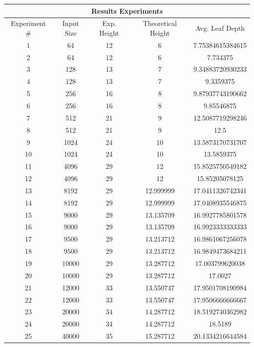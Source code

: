 \documentclass[12pt, a4paper]{article}
\begin{document}
\begin{table}[H]
    \begin{tabular}{ |c|c|c|c|c| }
      \hline
      \multicolumn{5}{|c|}{Results Experiments} \\
      \hline
      Experiment \# & Input Size & Exp. Height & Theoretical Height & Avg. Leaf Depth  \\
      \hline
      1 & 64 & 12 & 6 & 7.75384615384615 \\
      2 & 64 & 12 & 6 & 7.734375 \\
      3 & 128 & 13 & 7 & 9.34883720930233 \\
      4 & 128 & 13 & 7 & 9.3359375 \\
      5 & 256 & 16 & 8 & 9.87937743190662 \\
      6 & 256 & 16 & 8 & 9.85546875 \\
      7 & 512 & 21 & 9 & 12.5087719298246 \\
      8 & 512 & 21 & 9 & 12.5 \\
      9 & 1024 & 24 & 10 & 13.5873170731707 \\
      10 & 1024 & 24 & 10 & 13.5859375 \\
      11 & 4096 & 29 & 12 & 15.8525750549182 \\
      12 & 4096 & 29 & 12 & 15.85205078125 \\
      13 & 8192 & 29 & 12.999999 & 17.0411326742341 \\
      14 & 8192 & 29 & 12.999999 & 17.0408935546875 \\
      15 & 9000 & 29 & 13.135709 & 16.9927785801578 \\
      16 & 9000 & 29 & 13.135709 & 16.9923333333333 \\
      17 & 9500 & 29 & 13.213712 & 16.9861067256078 \\
      18 & 9500 & 29 & 13.213712 & 16.9849473684211 \\
      19 & 10000 & 29 & 13.287712 & 17.003799620038 \\
      20 & 10000 & 29 & 13.287712 & 17.0027 \\
      21 & 12000 & 33 & 13.550747 & 17.9501708190984 \\
      22 & 12000 & 33 & 13.550747 & 17.9506666666667 \\
      23 & 20000 & 34 & 14.287712 & 18.5192740362982 \\
      24 & 20000 & 34 & 14.287712 & 18.5189 \\
      25 & 40000 & 35 & 15.287712 & 20.1334216644584 \\

\end{tabular}
\end{table}
\end{document}
